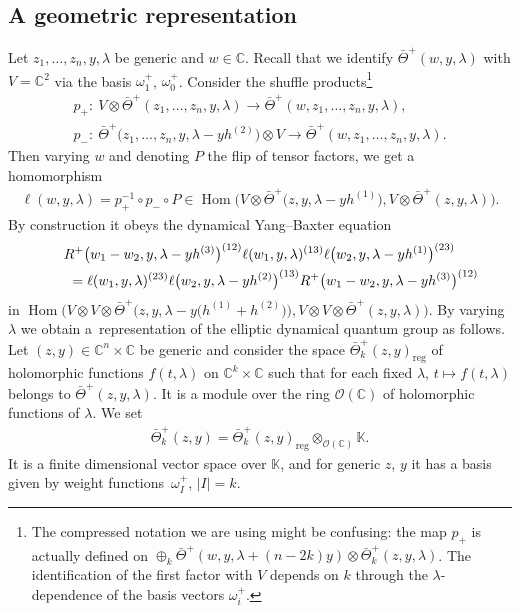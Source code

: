 \documentclass[10pt,a4paper]{amsart}
\numberwithin{equation}{section}
\begin{document}
\subsection{A geometric representation}\label{ss-3.7}
Let $z_1,\dots,z_n,y,\lambda$ be generic and $w\in\mathbb C$. Recall that we identify $\bar\Theta^+(w,y,\lambda)$ with $V=\mathbb C^2$ via the basis $\omega^+_1$, $\omega^+_0$. Consider the shuffle products\footnote{The compressed notation we are using might be confusing: the map $p_+$ is actually defined on $\oplus_k \bar\Theta^+(w,y,\lambda+(n-2k)y)\otimes\bar\Theta^+_k(z,y,\lambda)$. The identification of the first factor with $V$ depends on $k$ through the $\lambda$-dependence of the basis vectors $\omega^+_i$.}
\begin{gather*}
p_+\colon \ V \otimes \bar\Theta^+(z_1,\dots,z_n,y,\lambda)\to\bar\Theta^+(w,z_1,\dots,z_n,y,\lambda),\\
p_-\colon \ \bar\Theta^+\big(z_1,\dots,z_n,y,\lambda-yh^{(2)}\big)\otimes V \to \bar\Theta^+(w,z_1,\dots,z_n,y,\lambda).
\end{gather*}
Then varying $w$ and denoting $P$ the flip of tensor factors, we get a homomorphism
\begin{gather*}
 \ell(w,y,\lambda)=p_+^{-1}\circ p_-\circ P\in\operatorname{Hom}\big(V\otimes \bar\Theta^+\big(z,y,\lambda-y h^{(1)}\big),V\otimes \bar\Theta^+(z,y,\lambda)\big).
\end{gather*}
By construction it obeys the dynamical Yang--Baxter equation
\begin{gather}
 R^+\big(w_1-w_2,y,\lambda-y h^{(3)}\big)^{(12)}\ell(w_1,y,\lambda)^{(13)} \ell\big(w_2,y,\lambda-y h^{(1)}\big)^{(23)}\notag\\
\qquad{} = \ell(w_1,y,\lambda)^{(23)}\ell\big(w_2,y,\lambda-y h^{(2)}\big)^{(13)} R^+\big(w_1-w_2,y,\lambda-y h^{(3)}\big)^{(12)}\label{e-YBE1}
\end{gather}
in $\operatorname{Hom}\big(V\otimes V\otimes \bar\Theta^+\big(z,y,\lambda-y\big(h^{(1)}+h^{(2)}\big)\big), V\otimes V\otimes \bar\Theta^+(z,y,\lambda)\big)$. By varying $\lambda$ we obtain a~representation of the elliptic dynamical quantum group as follows. Let $(z,y)\in\mathbb C^n\times \mathbb C$ be generic and consider the space $\bar\Theta^+_k(z,y)_{\mathrm{reg}}$ of holomorphic functions $f(t,\lambda)$ on $\mathbb C^k\times \mathbb C$ such that for each fixed $\lambda$, $t\mapsto f(t,\lambda)$ belongs to $\bar\Theta^+(z,y,\lambda)$. It is a module over the ring $\mathcal O(\mathbb C)$ of holomorphic functions of $\lambda$. We set
\begin{gather*}
 \bar\Theta^+_k(z,y)=\bar\Theta^+_k(z,y)_{\mathrm{reg}}\otimes_{\mathcal O(\mathbb C)}\mathbb K.
\end{gather*}
It is a finite dimensional vector space over $\mathbb K$, and for generic $z$, $y$ it has a basis given by weight functions~$\omega^+_I$, $|I|=k$.
\end{document}
